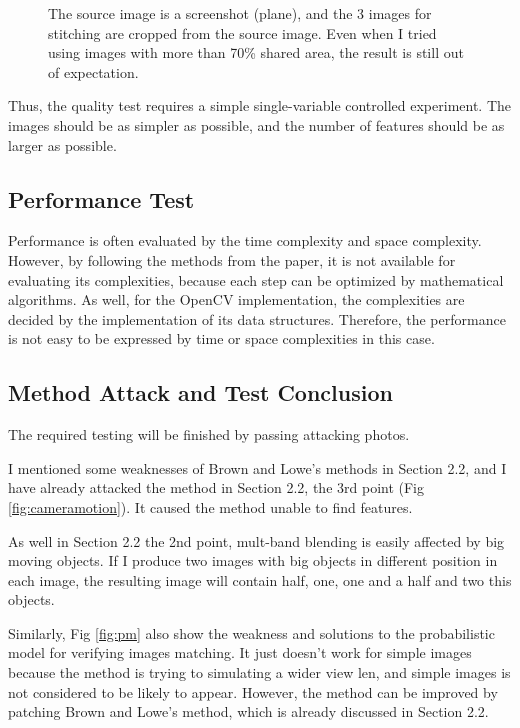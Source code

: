 \documentclass[10pt,twocolumn,letterpaper]{article}
\begin{document}
\begin{figure}[t]
\begin{center}
    \end{center}
    \caption{The source image is a screenshot (plane), and the 3 images for stitching are cropped from the source image.
    Even when I tried using images with more than 70\% shared area, the result is still out of expectation.}
    \label{fig:fail}
\end{figure}

Thus, the quality test requires a simple single-variable controlled experiment.
The images should be as simpler as possible, and the number of features should be as larger as possible.

\subsection{Performance Test}
Performance is often evaluated by the time complexity and space complexity.
However, by following the methods from the paper, it is not available for evaluating its complexities,
because each step can be optimized by mathematical algorithms. 
As well, for the OpenCV implementation, the complexities are decided by the implementation of its data structures.
Therefore, the performance is not easy to be expressed by time or space complexities in this case.

\subsection{Method Attack and Test Conclusion}
The required testing will be finished by passing attacking photos.

I mentioned some weaknesses of Brown and Lowe's methods in Section 2.2,
and I have already attacked the method in Section 2.2, the 3rd point (Fig \ref{fig:cameramotion}).
It caused the method unable to find features.

As well in Section 2.2 the 2nd point, mult-band blending is easily affected by big moving objects.
If I produce two images with big objects in different position in each image, the resulting image will contain half, one, one and a half and two this objects.

Similarly, Fig \ref{fig:pm} also show the weakness and solutions to the probabilistic model for verifying images matching.
It just doesn't work for simple images because the method is trying to simulating a wider view len, and simple images is not considered to be likely to appear.
However, the method can be improved by patching Brown and Lowe's method, which is already discussed in Section 2.2.
\end{document}
